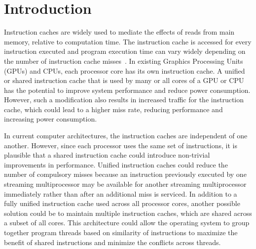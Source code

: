 \section{Introduction}


Instruction caches are widely used to mediate the effects of reads
from main memory, relative to computation time. 
The instruction cache is accessed for every instruction executed and
program execution time can vary widely depending on the number of
instruction cache misses~\cite{arnold94}. 
In existing Graphics Processing Units (GPUs) and CPUs, each processor
core has its own instruction cache. 
A unified or shared instruction cache that is used by many or all
cores of a GPU or CPU has the potential to improve system performance
and reduce power consumption.
However, such a modification also results in increased traffic for the
instruction cache, which could lead to a higher miss rate, reducing
performance and increasing power consumption. 


In current computer architectures, the instruction caches are
independent of one another. 
However, since each processor uses the same
set of instructions, it is plausible that a shared instruction cache
could introduce non-trivial improvements in performance. 
Unified instruction caches could reduce the number of compulsory
misses because an instruction previously executed by one streaming
multiprocessor may be available for another streaming multiprocessor
immediately rather than after an additional miss is serviced. 
In addition to a fully unified instruction cache used across all
processor cores, another possible solution could be to maintain
multiple instruction caches, which are shared across a subset of all
cores. 
This architecture could allow the operating system to group together
program threads based on similarity of instructions to maximize the
benefit of shared instructions and minimize the conflicts across
threads. 

